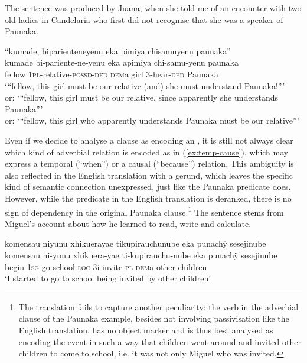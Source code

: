 The sentence was produced by Juana, when she told me of an encounter with two old ladies in Candelaria who first did not recognise that she was a speaker of Paunaka.


\ea\label{ex:CoC-AC-RC}
\begingl
\glpreamble “kumade, biparienteneyenu eka pimiya chisamuyenu paunaka”\\
\gla kumade bi-pariente-ne-yenu eka apimiya chi-samu-yenu paunaka\\ 
\glb fellow 1\textsc{pl}-relative-\textsc{possd}-\textsc{ded} \textsc{dem}a girl 3-hear-\textsc{ded} Paunaka\\ 
\glft ‘“fellow, this girl must be our relative (and) she must understand Paunaka!”’ \\ or: ‘“fellow, this girl must be our relative, since apparently she understands Paunaka”’ \\or: ‘“fellow, this girl who apparently understands Paunaka must be our relative”’
\endgl
\trailingcitation{[jxx-p120515l-1.108]}
\xe

Even if we decide to analyse a clause as encoding an , it is still not always clear which kind of adverbial relation is encoded as in (\ref{ex:temp-cause}), which may express a temporal (“when”) or a causal (“because”) relation. This ambiguity is also reflected in the English translation with a gerund, which leaves the specific kind of semantic connection unexpressed, just like the Paunaka predicate does. However, while the predicate in the English translation is deranked, there is no sign of dependency in the original Paunaka clause.\footnote{The translation fails to capture another peculiarity: the verb in the adverbial clause of the Paunaka example, besides not involving passivisation like the English translation, has no object marker and is thus best analysed as encoding the event in such a way that children went around and invited other children to come to school, i.e. it was not only Miguel who was invited.} The sentence stems from Miguel’s account about how he learned to read, write and calculate.

\ea\label{ex:temp-cause}
\begingl
\glpreamble komensau niyunu xhikuerayae tikupirauchunube eka punachÿ sesejinube\\
\gla komensau ni-yunu xhikuera-yae ti-kupirauchu-nube eka punachÿ sesejinube\\
\glb begin 1\textsc{sg}-go school-\textsc{loc} 3i-invite-\textsc{pl} \textsc{dem}a other children\\
\glft ‘I started to go to school being invited by other children’
\endgl
\trailingcitation{[mxx-p181027l-1.003]}
\xe

